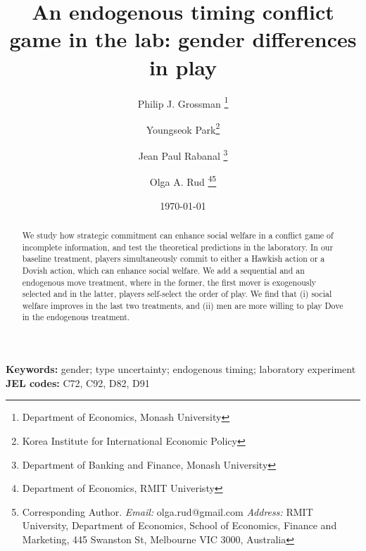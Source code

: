 \documentclass[11pt, letterpaper]{article}
\theoremstyle{plain}
\begin{document}
\newtheorem{Assumption}{Assumption}
\newtheorem{Proposition}{Proposition}
\newtheorem{Corollary}{Corollary}
\newtheorem{Hypothesis}{Hypothesis}
\newtheorem{Result}{Result}


\title{An endogenous timing conflict game in the lab: gender differences in play }

\author{Philip J. Grossman
\thanks{Department of Economics, Monash University} \and Youngseok Park\thanks{Korea Institute for International Economic Policy} \and Jean Paul Rabanal
\footnote{Department of Banking and Finance, Monash University} \and Olga A. Rud \footnote{Department of Economics, RMIT Univeristy}\thanks{Corresponding Author. \textit{Email:} olga.rud@gmail.com \textit{Address:} RMIT University, Department of Economics, School of Economics, Finance and Marketing, 445 Swanston St, Melbourne VIC 3000, Australia}}\date{\today}
\maketitle


\begin{abstract}
We study how strategic commitment can enhance social welfare in a conflict game of incomplete information, and test the theoretical predictions in the laboratory. In our baseline treatment, players simultaneously commit to either a Hawkish action or a Dovish action, which can enhance social welfare. We add a sequential and an endogenous move treatment, where in the former, the first mover is exogenously selected and in the latter, players self-select the order of play. We find that (i) social welfare improves in the last two treatments, and (ii) men are more willing to play Dove in the endogenous treatment.

\end{abstract}
\textbf{Keywords:}
gender; type uncertainty; endogenous timing; laboratory experiment\\
\textbf{JEL codes:} C72, C92, D82, D91
\newpage
\end{document}
